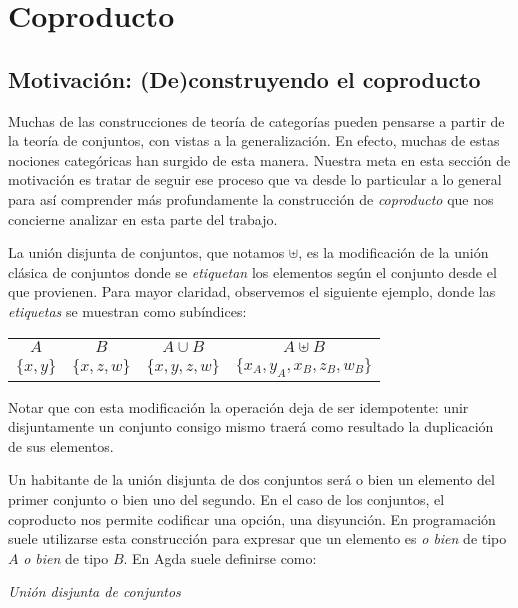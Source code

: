 \section{Coproducto}\label{cons:coprod}

\subsection{Motivación: (De)construyendo el coproducto}

Muchas de las construcciones de teoría de categorías pueden pensarse a partir de la teoría de conjuntos, con vistas a la generalización. En efecto, muchas de estas nociones categóricas han surgido de esta manera. 
Nuestra meta en esta sección de motivación es tratar de seguir ese proceso que va desde lo particular a lo general para así comprender más profundamente la construcción de {\it coproducto} que nos concierne analizar en esta parte del trabajo.

La unión disjunta de conjuntos, que notamos $\uplus$, es la modificación de la unión clásica de conjuntos donde se {\it etiquetan} los elementos según el conjunto desde el que provienen. Para mayor claridad, observemos el siguiente ejemplo, donde las {\it etiquetas} se muestran como subíndices:
\begin{center}
\begin{tabular}{c c c c}
  $A$ & $B$ & $A \cup B$ & $A \uplus B$ \\
  $\{ x , y \}$ & $\{ x, z, w \}$ &  $\{ x, y, z , w \}$ & $\{ x_{A} , y_{A}, x_{B}, z_{B}, w_{B} \}$
\end{tabular}
\end{center}


Notar que con esta modificación la operación deja de ser idempotente: unir disjuntamente un conjunto consigo mismo traerá como resultado la duplicación de sus elementos.

Un habitante de la unión disjunta de dos conjuntos será o bien un elemento del primer conjunto o bien uno del segundo. En el caso de los conjuntos, el coproducto nos permite codificar una opción, una disyunción.
En programación suele utilizarse esta construcción para expresar que un elemento es {\it o bien} de tipo $A$ {\it o bien} de tipo $B$.
 En Agda suele definirse como:

\begin{agdacode}{\it Unión disjunta de conjuntos}\label{code:uplus}
  
\end{agdacode}

